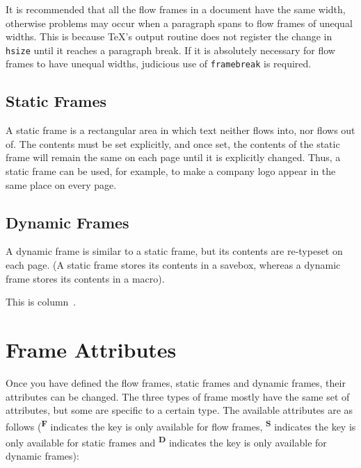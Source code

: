 \documentclass[a4paper]{report}
\newcommand{\cmdname}[1]{\texttt{\symbol{92}#1}}
\begin{document}
It is recommended that all the flow frames in a document
have the same width, otherwise problems may occur
when a paragraph spans to flow frames of unequal
widths. This is because \TeX's output routine does not
register the change in \cmdname{hsize} until it reaches
a paragraph break. If it is absolutely necessary for 
flow frames to have unequal widths, judicious use of
\cmdname{framebreak} is required.

\section*{Static Frames}

A static frame is a rectangular area in which text neither
flows into, nor flows out of.  The contents must be set
explicitly, and once set, the contents of the static frame will
remain the same on each page until it is explicitly 
changed.  Thus, a static frame can be used, for example, to make 
a company logo appear in the same place on every page.

\section*{Dynamic Frames}

A dynamic frame is similar to a static frame, but its contents
are re-typeset on each page. (A static frame stores its 
contents in a savebox, whereas a dynamic frame stores its
contents in a macro).

This is column~\thedisplayedframe.

\chapter{Frame Attributes}
\label{sec:modattr}

Once you have defined the {flow frames}, {static frames} and 
{dynamic frames}, their attributes can be changed. 
The three types of frame mostly have the 
same set of attributes, but some are specific to a certain type.
The available attributes are as follows
(\textsuperscript{\textbf{F}} indicates the key is
only available for {flow frames}, 
\textsuperscript{\textbf{S}} indicates the key is only available 
for {static frames}
and \textsuperscript{\textbf{D}} indicates the key
is only available for {dynamic frames}):
\end{document}
